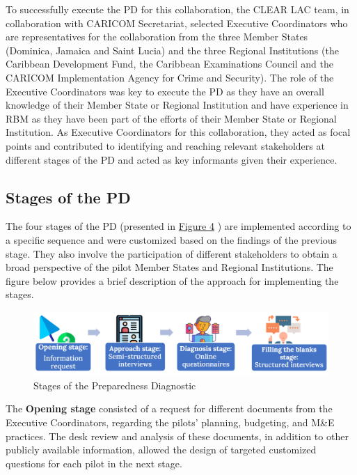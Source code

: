 \documentclass[
]{book}
\begin{document}
To successfully execute the PD for this collaboration, the CLEAR LAC team, in collaboration with CARICOM Secretariat, selected Executive Coordinators who are representatives for the collaboration from the three Member States (Dominica, Jamaica and Saint Lucia) and the three Regional Institutions (the Caribbean Development Fund, the Caribbean Examinations Council and the CARICOM Implementation Agency for Crime and Security). The role of the Executive Coordinators was key to execute the PD as they have an overall knowledge of their Member State or Regional Institution and have experience in RBM as they have been part of the efforts of their Member State or Regional Institution. As Executive Coordinators for this collaboration, they acted as focal points and contributed to identifying and reaching relevant stakeholders at different stages of the PD and acted as key informants given their experience.

\hypertarget{stages-of-the-pd}{%
\subsection*{Stages of the PD}\label{stages-of-the-pd}}

The four stages of the PD (presented in \protect\hyperlink{fig:figure4}{Figure 4} ) are implemented according to a specific sequence and were customized based on the findings of the previous stage. They also involve the participation of different stakeholders to obtain a broad perspective of the pilot Member States and Regional Institutions. The figure below provides a brief description of the approach for implementing the stages.

\begin{figure}
\includegraphics[width=1\linewidth]{./images/figure_4} \caption{Stages of the Preparedness Diagnostic}\label{fig:figure4}
\end{figure}

The \textbf{Opening stage} consisted of a request for different documents from the Executive Coordinators, regarding the pilots' planning, budgeting, and M\&E practices. The desk review and analysis of these documents, in addition to other publicly available information, allowed the design of targeted customized questions for each pilot in the next stage.
\end{document}

